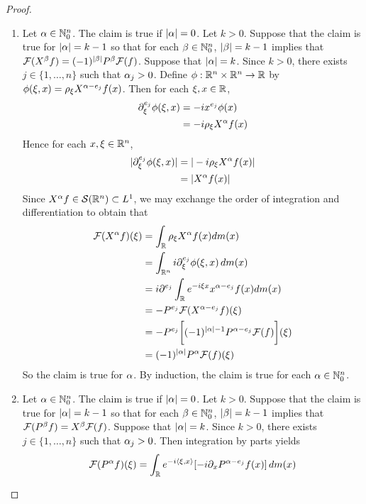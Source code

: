 \documentclass{book}
\begin{document}
	\begin{proof}\
		\begin{enumerate}
			\item Let $\alpha \in \mathbb{N}_0^n$. The claim is true if $|\alpha| = 0$. Let $k > 0$. Suppose that the claim is true for $|\alpha| = k-1$ so that for each $\beta \in \mathbb{N}_0^n$, $|\beta| = k-1$ implies that $\mathcal{F}(X^{\beta}f) = (-1)^{|\beta|}P^{\beta} \mathcal{F}(f)$. Suppose that $|\alpha| = k$. Since $k > 0$, there exists $j \in \{1, \ldots, n\}$ such that $\alpha_j > 0$. Define $\phi:\mathbb{R}^n \times \mathbb{R}^n \rightarrow \mathbb{R}$ by $\phi(\xi, x) = \rho_{\xi} X^{\alpha - e_j}f(x)$. Then for each $\xi, x \in \mathbb{R}$, 
			\begin{align*}
				\partial^{e_j}_{\xi} \phi(\xi, x)
				& = -ix^{e_j} \phi(x) \\
				& = -i \rho_{\xi} X^{\alpha}f(x) \\
			\end{align*}
			Hence for each $x, \xi \in \mathbb{R}^n$, 
			\begin{align*}
				|\partial^{e_j}_{\xi} \phi(\xi, x)|
				& = |-i \rho_{\xi} X^{\alpha}f(x)| \\
				& = |X^{\alpha}f(x)|
			\end{align*}
			Since $X^{\alpha}f \in \mathcal{S}(\mathbb{R}^n) \subset L^1$, we may exchange the order of integration and differentiation to obtain that
			\begin{align*}
				\mathcal{F}(X^{\alpha}f) (\xi)
				& = \int_{\mathbb{R}} \rho_{\xi} X^{\alpha}f(x) dm(x) \\
				& = \int_{\mathbb{R}^n} i\partial^{e_j}_{\xi} \phi(\xi, x) \, d m(x) \\
				& = i \partial^{e_j}  \int_{\mathbb{R}} e^{-i\xi x}x^{\alpha-e_j}f(x) dm(x)  \\
				& = -P^{e_j} \mathcal{F}(X^{\alpha-e_j}f) (\xi) \\
				& = -P^{e_j} \bigg[ (-1)^{|\alpha| - 1} P^{\alpha - e_j} \mathcal{F}(f) \bigg] (\xi) \\
				& = (-1)^{|\alpha|}P^{\alpha} \mathcal{F}(f) (\xi)
			\end{align*}
			So the claim is true for $\alpha$. By induction, the claim is true for each $\alpha \in \mathbb{N}_0^n$.
			\item  Let $\alpha \in \mathbb{N}_0^n$. The claim is true if $|\alpha| = 0$. Let $k > 0$. Suppose that the claim is true for $|\alpha| = k-1$ so that for each $\beta \in \mathbb{N}_0^n$, $|\beta| = k-1$ implies that $\mathcal{F}(P^{\beta}f) = X^{\beta} \mathcal{F}(f)$. Suppose that $|\alpha| = k$. Since $k > 0$, there exists $j \in \{1, \ldots, n\}$ such that $\alpha_j > 0$.
			Then integration by parts yields 
			\begin{align*}
				\MF(P^{\al}f)(\xi)
				& = \int_{\R} e^{-i \l \xi , x \r} [-i \p_x P^{\al-e_j}f(x)] \dm(x) \\

\end{align*}
\end{enumerate}
\end{proof}
\end{document}
